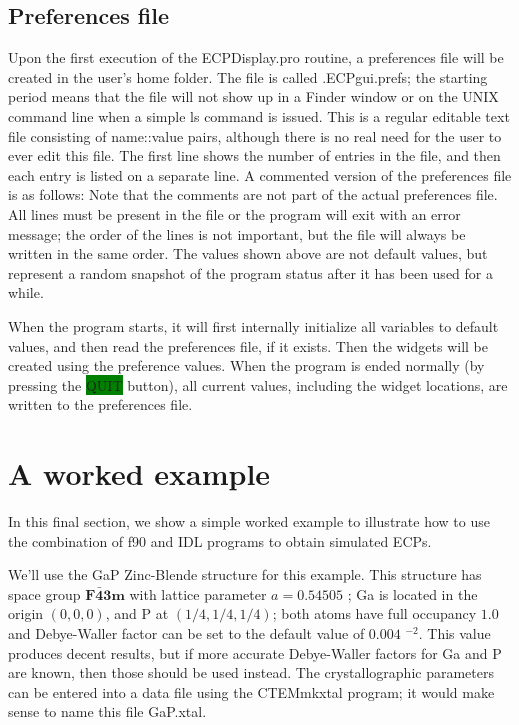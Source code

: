 \documentclass[DIV=calc, paper=letter, fontsize=11pt]{scrartcl}	 %
\newcommand{\button}[1]{\colorbox{green}{\textsf{#1}} button}
\begin{document}
\subsection{Preferences file\label{sec:idlpref}}
Upon the first execution of the \textsf{ECPDisplay.pro} routine, a preferences file will be created in the user's home folder.  
The file is called \textsf{.ECPgui.prefs}; the starting period
means that the file will not show up in a Finder window or on the UNIX command line when a simple \textsf{ls} command is issued.  This is a 
regular editable text file consisting of name::value pairs, although there is no real
need for the user to ever edit this file.  The first line shows the number of entries in the file, and then each entry is listed on a 
separate line.  A commented version of the preferences file is as follows:
Note that the comments are not part of the actual preferences file.  All lines must be present in the file or the program will exit with an error message; the order 
of the lines is not important, but the file will always be written in the same order.
The values shown above are not default values, but represent a random snapshot of the program status after it has been used for a while.

When the program starts, it will first internally initialize all variables to default values, and then read the preferences
file, if it exists.  Then the widgets will be created using the preference values.  When the program is ended normally (by
pressing the \button{QUIT}), all current values, including the widget locations, are written to the preferences
file.

\section{A worked example\label{sec:examples}}
In this final section, we show a simple worked example to illustrate how to use the combination of f90 and IDL programs 
to obtain simulated ECPs.  

We'll use the GaP Zinc-Blende structure for this example.  This structure has space group $\mathbf{F\bar{4}3m}$ with lattice parameter
$a=0.54505$ \nano\meter; Ga is located in the origin $(0,0,0)$, and P at $(1/4,1/4,1/4)$; both atoms have full occupancy $1.0$
and Debye-Waller factor can be set to the default value of $0.004$ \nano\meter$^{-2}$.  This value produces decent results, but 
if more accurate Debye-Waller factors for Ga and P are known, then those should be used instead.  The crystallographic parameters
can be entered into a data file using the \textsf{CTEMmkxtal} program; it would make sense to name this file \textsf{GaP.xtal}.
\end{document}
